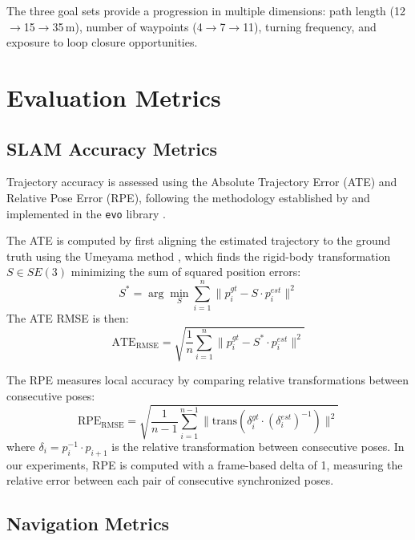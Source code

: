 The three goal sets provide a progression in multiple dimensions: path length (12$\rightarrow$15$\rightarrow$35\,m), number of waypoints (4$\rightarrow$7$\rightarrow$11), turning frequency, and exposure to loop closure opportunities.

\section{Evaluation Metrics}

\subsection{SLAM Accuracy Metrics}

Trajectory accuracy is assessed using the Absolute Trajectory Error (ATE) and Relative Pose Error (RPE), following the methodology established by \citet{sturm2012benchmark} and implemented in the \texttt{evo} library \citep{grupp2017evo}.

The ATE is computed by first aligning the estimated trajectory to the ground truth using the Umeyama method \citep{umeyama1991}, which finds the rigid-body transformation $S \in SE(3)$ minimizing the sum of squared position errors:
\begin{equation}
S^* = \arg\min_S \sum_{i=1}^{n} \| p_i^{gt} - S \cdot p_i^{est} \|^2
\label{eq:alignment}
\end{equation}
The ATE RMSE is then:
\begin{equation}
\text{ATE}_{\text{RMSE}} = \sqrt{\frac{1}{n} \sum_{i=1}^{n} \| p_i^{gt} - S^* \cdot p_i^{est} \|^2}
\label{eq:ate}
\end{equation}

The RPE measures local accuracy by comparing relative transformations between consecutive poses:
\begin{equation}
\text{RPE}_{\text{RMSE}} = \sqrt{\frac{1}{n-1} \sum_{i=1}^{n-1} \| \text{trans}(\delta_i^{gt} \cdot (\delta_i^{est})^{-1}) \|^2}
\label{eq:rpe}
\end{equation}
where $\delta_i = p_i^{-1} \cdot p_{i+1}$ is the relative transformation between consecutive poses. In our experiments, RPE is computed with a frame-based delta of 1, measuring the relative error between each pair of consecutive synchronized poses.

\subsection{Navigation Metrics}

